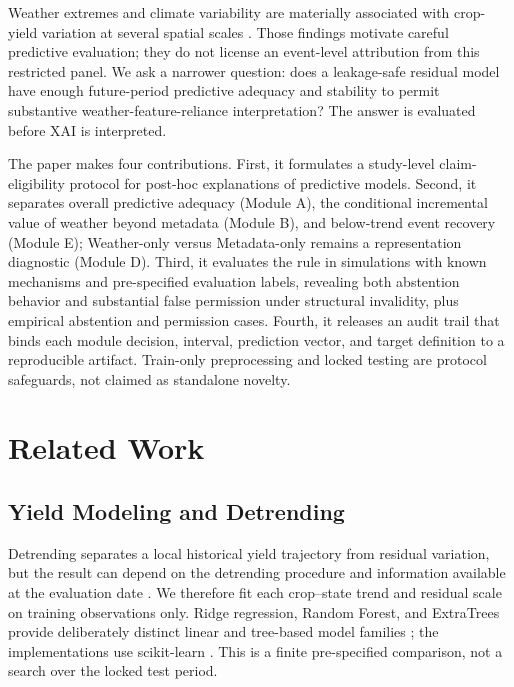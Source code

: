 \documentclass[conference]{IEEEtran}
\begin{document}
Weather extremes and climate variability are materially associated with crop-yield
variation at several spatial scales \cite{Lesk2016,Ray2015,SchlenkerRoberts2009,Zampieri2017,Schierhorn2021}.
Those findings motivate careful predictive evaluation; they do not license an
event-level attribution from this restricted panel. We ask a narrower question:
does a leakage-safe residual model have enough future-period predictive adequacy and stability
to permit substantive weather-feature-reliance interpretation? The answer is
evaluated before XAI is interpreted.

The paper makes four contributions. First, it formulates a study-level
claim-eligibility protocol for post-hoc explanations of predictive models. Second,
it separates overall predictive adequacy (Module A), the conditional incremental
value of weather beyond metadata (Module B), and below-trend event recovery
(Module E); Weather-only versus Metadata-only remains a representation diagnostic
(Module D). Third, it evaluates the rule in simulations with known mechanisms and
pre-specified evaluation labels, revealing both abstention behavior and
substantial false permission under structural invalidity, plus empirical
abstention and permission cases. Fourth, it
releases an audit trail that binds each module decision, interval, prediction vector, and
target definition to a reproducible artifact. Train-only preprocessing and locked
testing are protocol safeguards, not claimed as standalone novelty.

\section{Related Work}
\subsection{Yield Modeling and Detrending}
Detrending separates a local historical yield trajectory from residual variation,
but the result can depend on the detrending procedure and information available at
the evaluation date \cite{Lu2017,Meng2024}. We therefore fit each crop--state trend
and residual scale on training observations only. Ridge regression, Random Forest,
and ExtraTrees provide deliberately distinct linear and tree-based model families
\cite{HoerlKennard1970,Breiman2001,Geurts2006}; the implementations use
scikit-learn \cite{Pedregosa2011}. This is a finite pre-specified comparison, not
a search over the locked test period.
\end{document}
